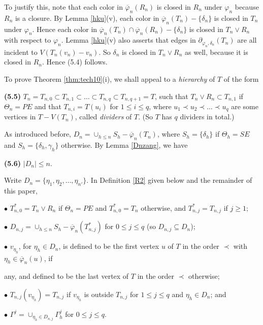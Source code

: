 \documentclass[11pt]{article}
\newcommand{\phibar}{\overline{\varphi}}
\begin{document}
To justify this, note that each color in $\overline{\varphi}_n(R_n)$ is closed in $R_n$ under $\varphi_n$ because
$R_n$ is a closure. By Lemma \ref{hku}(v), each color in  $\overline{\varphi}_n(T_n)-\{\delta_n\}$ is closed in 
$T_n$ under $\varphi_n$. Hence each color in $\overline{\varphi}_n(T_n) \cap \overline{\varphi}_n(R_n)-\{\delta_n\}$ 
is closed in $T_n \vee R_n$ with respect to $\varphi_n$. Lemma \ref{hku}(v) also asserts that edges in $\partial_{\varphi_n, \delta_n}(T_n)$ are all incident to $V(T_n(v_n)-v_n)$. So $\delta_n$ is closed in $T_n \vee R_n$ as well, because it is closed in $R_n$. Hence (5.4) follows.  

\vskip 2mm
To prove Theorem \ref{thm:tech10}(i), we shall appeal to a {\em hierarchy}\label{hierar} of $T$ of the form

{\bf (5.5)} $T_n=T_{n,0} \subset T_{n,1} \subset \ldots \subset T_{n,q} \subset T_{n,q+1}=T$, such that $T_n\vee R_n 
\subset T_{n,1}$ if $\Theta_n=PE$ and that $T_{n,i}=T(u_i)$ for $1\le i\leq q$, where $u_1\prec u_2\prec \ldots 
\prec u_{q}$ are some vertices in $T-V(T_n)$, called {\it dividers} of $T$. (So $T$ has $q$ dividers in total.) 


As introduced before, $D_n=\cup_{h\leq n}S_h-\phibar_n(T_n)$, where $S_h=\{\delta_h\}$ 
if $\Theta_h=SE$ and $S_h=\{\delta_h,\gamma_h\}$ otherwise. By Lemma \ref{Dnzang}, we have

{\bf (5.6)} $|D_n|\leq n$. 

\noindent Write $D_n=\{\eta_1, \eta_2, \ldots ,\eta_{n'}\}$. In Definition \ref{R2} given below and the remainder of
this paper,

\vskip 1mm
$\bullet$ $T_{n,0}^*= T_{n}\vee R_n$ if $\Theta_n=PE$ and $T_{n,0}^*= T_{n}$ otherwise, and $T_{n,j}^*=T_{n,j}$ if $j \ge 1$;

$\bullet$ $D_{n,j}=\cup_{h\leq n}S_h-\phibar_n(T_{n,j}^*)$ for $0 \le j \le q$ (so $D_{n,j}\subseteq D_n$);  

$\bullet$ $v_{\eta_h}$, for $\eta_h \in D_n$, is defined to be the first vertex $u$ of $T$ in the order $\prec$ with  $\eta_h \in 
\phibar_n (u)$, if  

\hskip 3mm any, and defined to be the last vertex of $T$ in the order $\prec$ otherwise; 


$\bullet$ $T_{n,j}(v_{\eta_h})=T_{n,j}$ if $v_{\eta_h}$ is outside $T_{n,j}$ for $1 \le j \le q$ and $\eta_h \in D_n$; and

$\bullet$ $\Gamma^{j}=\cup_{\eta_h\in D_{n,j}}\Gamma^{j}_h$ for $0 \le j \le q$.
\end{document}
